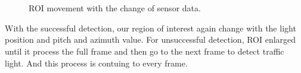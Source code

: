 \begin{figure}[!ht]
\centering
{}\\
\\

\caption{ROI movement with the change of sensor data.}
\label{f:rec_mv}
\end{figure}


With the successful detection, our region of interest again change with the light position and pitch and azimuth value.
For unsuccessful detection, ROI enlarged until it process the full frame and then go to the next frame to detect traffic light.
And this process is contuing to every frame.

